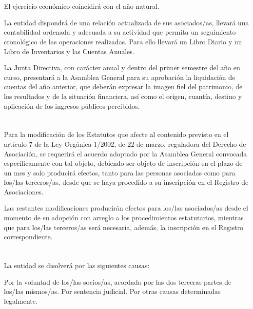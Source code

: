 \documentclass[draft]{estatutos}
\begin{document}
\begin{linenumbers}[1]
  \section{}
  El ejercicio económico coincidirá con el año natural.

  La entidad dispondrá de una relación actualizada de sus asociados/as, llevará
  una contabilidad ordenada y adecuada a su actividad que permita un
  seguimiento cronológico de las operaciones realizadas. Para ello llevará un
  Libro Diario y un Libro de Inventarios y las Cuentas Anuales.

  La Junta Directiva, con carácter anual y dentro del primer semestre del año
  en curso, presentará a la Asamblea General para su aprobación la liquidación
  de cuentas del año anterior, que deberán expresar la imagen fiel del
  patrimonio, de los resultados y de la situación financiera, así como el
  origen, cuantía, destino y aplicación de los ingresos públicos percibidos.


  \section{}
  Para la modificación de los Estatutos que afecte al contenido previsto en el
  artículo 7 de la Ley Orgánica 1/2002, de 22 de marzo, reguladora del Derecho
  de Asociación, se requerirá el acuerdo adoptado por la Asamblea General
  convocada específicamente con tal objeto, debiendo ser objeto de inscripción
  en el plazo de un mes y solo producirá efectos, tanto para las personas
  asociadas como para los/las terceros/as, desde que se haya procedido a su
  inscripción en el Registro de Asociaciones.

  Las restantes modificaciones producirán efectos para los/las asociados/as
  desde el momento de su adopción con arreglo a los procedimientos
  estatutarios, mientras que para los/las terceros/as será necesaria, además,
  la inscripción en el Registro correspondiente.


  \section{}
  La entidad se disolverá por las siguientes causas:

  \begin{enumerate}
  \sub Por la voluntad de los/las socios/as, acordada por las dos terceras
      partes de los/las mismos/as.
  \sub Por sentencia judicial.
  \sub Por otras causas determinadas legalmente.
  \end{enumerate}


\end{linenumbers}
\end{document}
